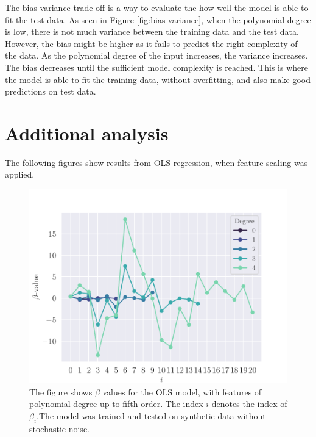 The bias-variance trade-off is a way to evaluate the how well the model is able to fit the test data. As seen in Figure \ref{fig:bias-variance}, when the polynomial degree is low, there is not much variance between the training data and the test data. However, the bias might be higher as it fails to predict the right complexity of the data. As the polynomial degree of the input increases, the variance increases. The bias decreases until the sufficient model complexity is reached. This is where the model is able to fit the training data, without overfitting, and also make good predictions on test data. 


\section{Additional analysis}\label{ap:additional_analysis}
The following figures show results from OLS regression, when feature scaling was applied.
\begin{figure}
    \centering
    \includegraphics[width=0.9\linewidth]{project-1/latex/figures/ols_beta_smooth_scaled_N50.pdf}
    \caption{The figure shows $\beta$ values for the OLS model, with features of polynomial degree up to fifth order. The index $i$ denotes the index of $\beta_{i}$.The model was trained and tested on synthetic data without stochastic noise.}
    \label{fig:ols_beta_smooth}
\end{figure}
